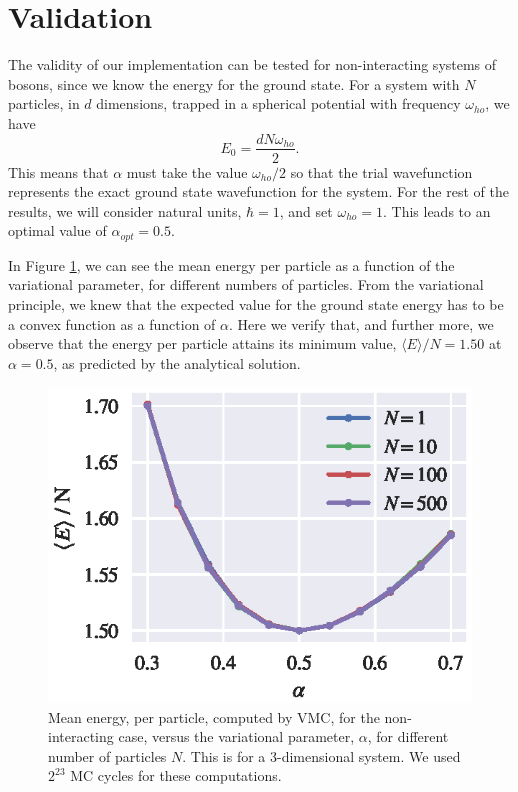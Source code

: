 \documentclass[aps,reprint,superscriptaddress,nofootinbib]{revtex4-2}
\begin{document}
    
\section*{Validation}

    The validity of our implementation can be tested for non-interacting systems of bosons, since we know the energy for the ground state. For a system with \(N\) particles, in \(d\) dimensions, trapped in a spherical potential with frequency \(\omega_{ho}\), we have
    \begin{equation*}
        E_0 = \frac{d N \omega_{ho} }{2}.
    \end{equation*}
    This means that \(\alpha\) must take the value \(\omega_{ho} / 2\) so that the trial wavefunction represents the exact ground state wavefunction for the system. For the rest of the results, we will consider natural units, \(\hbar = 1\), and set \(\omega_{ho} = 1\). This leads to an optimal value of \(\alpha_{opt} = 0.5\).
    
    In Figure \ref{fig:mean_E_vs_alpha}, we can see the mean energy per particle as a function of the variational parameter, for different numbers of particles. From the variational principle, we knew that the expected value for the ground state energy has to be a convex function as a function of \(\alpha\). Here we verify that, and further more, we observe that the energy per particle attains its minimum value, \(\langle E \rangle / N = 1.50\) at \(\alpha = 0.5\), as predicted by the analytical solution.
    \begin{figure}
        \centering
        \includegraphics{figures/part_b/E_vs_alphas.eps}
        \caption{Mean energy, per particle, computed by VMC, for the non-interacting case, versus the variational parameter, \(\alpha\), for different number of particles \(N\). This is for a 3-dimensional system. We used \(2^{23}\) MC cycles for these computations.}
        \label{fig:mean_E_vs_alpha}
    \end{figure}
    
\end{document}
